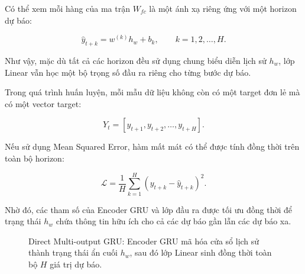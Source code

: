 \documentclass[12pt,oneside]{report}
\begin{document}
Có thể xem mỗi hàng của ma trận $W_{fc}$ là một ánh xạ riêng ứng với một horizon dự báo:

\[
\hat y_{t+k}
=
w^{(k)}h_w+b_k,
\qquad
k=1,2,\ldots,H.
\]

Như vậy, mặc dù tất cả các horizon đều sử dụng chung biểu diễn lịch sử $h_w$, lớp Linear vẫn học một bộ trọng số đầu ra riêng cho từng bước dự báo.

Trong quá trình huấn luyện, mỗi mẫu dữ liệu không còn có một target đơn lẻ mà có một vector target:

\[
Y_t
=
[y_{t+1},y_{t+2},\ldots,y_{t+H}].
\]

Nếu sử dụng Mean Squared Error, hàm mất mát có thể được tính đồng thời trên toàn bộ horizon:

\begin{equation}
\mathcal{L}
=
\frac{1}{H}
\sum_{k=1}^{H}
\left(
y_{t+k}-\hat y_{t+k}
\right)^2.
\end{equation}

Nhờ đó, các tham số của Encoder GRU và lớp đầu ra được tối ưu đồng thời để trạng thái $h_w$ chứa thông tin hữu ích cho cả các dự báo gần lẫn các dự báo xa.

\begin{figure}[H]
\centering


\caption{Direct Multi-output GRU: Encoder GRU mã hóa cửa sổ lịch sử thành trạng thái ẩn cuối $h_w$, sau đó lớp Linear sinh đồng thời toàn bộ $H$ giá trị dự báo.}

\label{fig:direct}
\end{figure}
\end{document}

